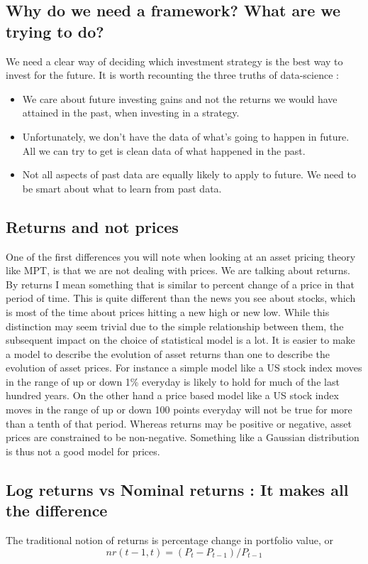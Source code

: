 \documentclass[a4paper]{article}
\begin{document}
\subsection{ Why do we need a framework? What are we trying to do? }
We need a clear way of deciding which investment strategy is the best way to invest for the future. It is worth recounting the three truths of data-science \cite{qpim2016}:\\
\begin{itemize}
	\item We care about future investing gains and not the returns we would have attained in the past, when investing in a strategy.
	\item Unfortunately, we don’t have the data of what's going to happen in future. All we can try to get is clean data of what happened in the past.
	\item Not all aspects of past data are equally likely to apply to future. We need to be smart about what to learn from past data.
\end{itemize}
\subsection{ Returns and not prices }
One of the first differences you will note when looking at an asset pricing theory like MPT, is that we are not dealing with prices. We are talking about returns. By returns I mean something that is similar to percent change of a price in that period of time. This is quite different than the news you see about stocks, which is most of the time about prices hitting a new high or new low. While this distinction may seem trivial due to the simple relationship between them, the subsequent impact on the choice of statistical model is a lot. It is easier to make a model to describe the evolution of asset returns than one to describe the evolution of asset prices. For instance a simple model like a US stock index moves in the range of up or down 1\% everyday is likely to hold for much of the last hundred years. On the other hand a price based model like a US stock index moves in the range of up or down 100 points everyday will not be true for more than a tenth of that period. Whereas returns may be positive or negative, asset prices are constrained to be non-negative. Something like a Gaussian distribution is thus not a good model for prices.  
\subsection{ Log returns vs Nominal returns : It makes all the difference }
The traditional notion of returns is percentage change in portfolio value, or
\[ nr(t-1,t ) =  (P_t - P_{t-1})/P_{t-1} \]
\end{document}
